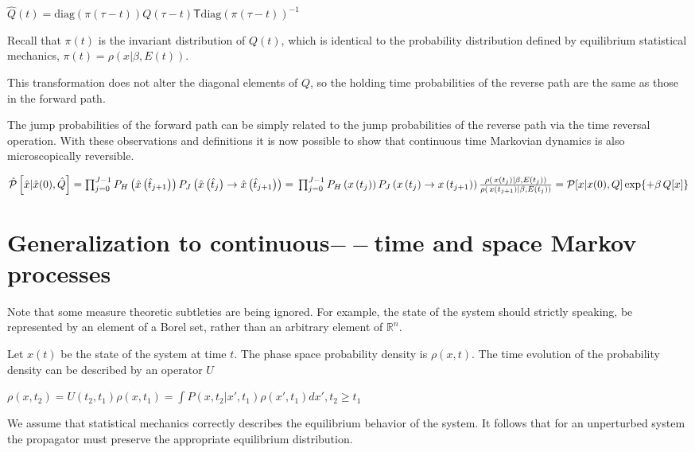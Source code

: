 \documentclass{article}
\begin{document}
\(\hat{Q}(t)=\text{diag}(\pi (\tau -t))Q(\tau -t)\mathsf{T}\text{diag}(\pi (\tau -t))^{-1}\)

Recall that \(\pi (t)\) is the invariant distribution of \(Q(t)\), which is identical to the probability distribution defined by equilibrium statistical
mechanics, \(\pi (t)=\rho (x|\beta ,E(t))\).

This transformation does not alter the diagonal elements of \(Q\), so the holding time probabilities of the reverse path are the same as those in
the forward path.

The jump probabilities of the forward path can be simply related to the jump probabilities of the reverse path via the time reversal operation. With
these observations and definitions it is now possible to show that continuous time Markovian dynamics is also microscopically reversible.

\(\hat{\mathcal{P}}\left[\hat{x}|\hat{x}(0),\hat{Q}\right]=\prod _{j=0}^{J-1} P_H\left(\hat{x}\left(\hat{t}_{j+1}\right)\right)P_J\left(\hat{x}\left(\hat{t}_j\right)\to
\hat{x}\left(\hat{t}_{j+1}\right)\right)=\\
\prod _{j=0}^{J-1} P_H\left(x\left(t_j\right)\right)P_J\left(x\left(t_j\right)\to x\left(t_{j+1}\right)\right)\frac{\rho \left(\left.x\left(t_j\right)\right|\beta
,E\left(t_j\right)\right)}{\rho \left(\left.x\left(t_{j+1}\right)\right|\beta ,E\left(t_j\right)\right)}=\\
\mathcal{P}[x|x(0),Q]\exp \{+\beta \, Q[x]\}\)

\section*{Generalization to continuous$--$time and space Markov processes}

Note that some measure theoretic subtleties are being ignored. For example, the state of the system should strictly speaking, be represented by an
element of a Borel set, rather than an arbitrary element of \(\mathbb{R}^n\).

Let \(x(t)\) be the state of the system at time \(t\). The phase space probability density is \(\rho (x,t)\). The time evolution of the probability
density can be described by an operator \(U\)

\(\rho \left(x,t_2\right)=U\left(t_2,t_1\right)\rho \left(x,t_1\right)=\int P\left(x,t_2|x',t_1\right)\rho \left(x',t_1\right)dx', t_2\geq t_1\)

We assume that statistical mechanics correctly describes the equilibrium behavior of the system. It follows that for an unperturbed system the propagator
must preserve the appropriate equilibrium distribution.
\end{document}
